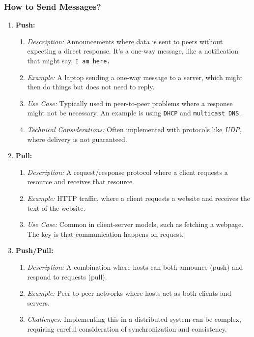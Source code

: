 \subsubsection{How to Send Messages?}
\begin{enumerate}
    \item \textbf{Push:}
    \begin{enumerate}[itemsep=0.5pt,topsep=0pt]
        \item \textit{Description:} Announcements where data is sent to peers without expecting a direct response. It's a one-way message, like a notification that might say, \texttt{I am here.}
        \item \textit{Example:} A laptop sending a one-way message to a server, which might then do things but does not need to reply.
        \item \textit{Use Case:} Typically used in peer-to-peer problems where a response might not be necessary. An example is using \texttt{DHCP} and \texttt{multicast DNS}.
        \item \textit{Technical Considerations:} Often implemented with protocols like \textit{UDP}, where delivery is not guaranteed.
    \end{enumerate}

    \item \textbf{Pull:}
    \begin{enumerate}[itemsep=0.5pt,topsep=0pt]
        \item \textit{Description:} A request/response protocol where a client requests a resource and receives that resource.
        \item \textit{Example:} HTTP traffic, where a client requests a website and receives the text of the website.
        \item \textit{Use Case:} Common in client-server models, such as fetching a webpage. The key is that communication happens on request.
    \end{enumerate}

    \item \textbf{Push/Pull:}
    \begin{enumerate}[itemsep=0.5pt,topsep=0pt]
        \item \textit{Description:} A combination where hosts can both announce (push) and respond to requests (pull).
        \item \textit{Example:} Peer-to-peer networks where hosts act as both clients and servers.
        \item \textit{Challenges:} Implementing this in a distributed system can be complex, requiring careful consideration of synchronization and consistency.
    \end{enumerate}
\end{enumerate}

